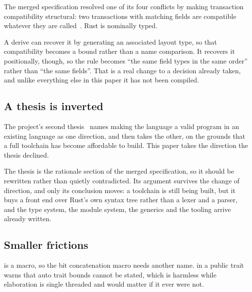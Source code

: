 The merged specification resolved one of its four conflicts by making
transaction compatibility structural: two transactions with matching fields
are compatible whatever they are called~\cite{unification}. Rust is
nominally typed.

A derive can recover it by generating an associated layout type, so that
compatibility becomes a bound rather than a name comparison. It recovers it
positionally, though, so the rule becomes ``the same field types in the
same order'' rather than ``the same fields''. That is a real change to a
decision already taken, and unlike everything else in this paper it has not
been compiled.

\subsection{A thesis is inverted}

The project's second thesis~\cite{theses} names making the language a valid
program in an existing language as one direction, and then takes the other,
on the grounds that a full toolchain has become affordable to build. This
paper takes the direction the thesis declined.

The thesis is the rationale section of the merged specification, so it
should be rewritten rather than quietly contradicted. Its argument survives
the change of direction, and only its conclusion moves: a toolchain is
still being built, but it buys a front end over Rust's own syntax tree
rather than a lexer and a parser, and the type system, the module system,
the generics and the tooling arrive already written.

\subsection{Smaller frictions}

 is a  macro, so the bit concatenation macro needs
another name.  in a public trait warns that auto trait
bounds cannot be stated, which is harmless while elaboration is single
threaded and would matter if it ever were not.
